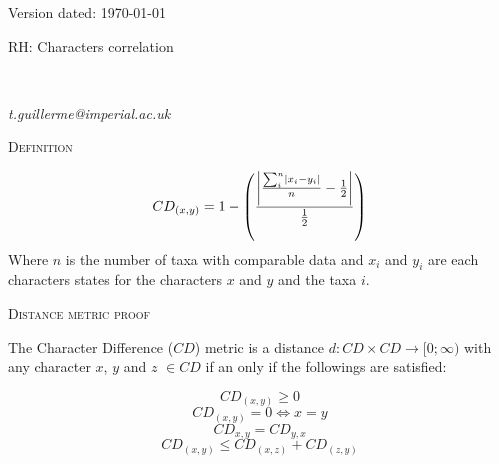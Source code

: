 \documentclass[12pt,letterpaper]{article}
\DeclarePairedDelimiter\abs{\lvert}{\rvert}%
\renewcommand{\section}[1]{%
\bigskip
\begin{center}
\begin{Large}
\normalfont\scshape #1
\medskip
\end{Large}
\end{center}}
\begin{document}
\begin{flushright}
Version dated: \today
\end{flushright}
\bigskip
\noindent RH: Characters correlation

\bigskip
\medskip
\begin{center}

\bigskip

\\
\end{center}
\medskip
{} \textit{t.guillerme@imperial.ac.uk}\\ 


\section{Definition}

\begin{equation}
    CD_{(x,y)} = 1 - \left(\frac{\abs*{\frac{\sum_{i}^{n}\abs{x_{i} - y_{i}}}{n}-\frac{1}{2}}}{\frac{1}{2}}\right)
\end{equation}
\noindent Where $n$ is the number of taxa with comparable data and $x_i$ and $y_i$ are each characters states for the characters $x$ and $y$ and the taxa $i$.

\newpage
\section{Distance metric proof}

The Character Difference ($CD$) metric is a distance $d: CD \times CD \rightarrow [0;\infty)$ with any character $x$, $y$ and $z$ $\in CD$ if an only if the followings are satisfied:

\begin{equation}
    \label{Positivity}
    CD_{(x,y)} \geq 0
\end{equation}
\begin{equation}
    \label{Identity}
    CD_{(x,y)} = 0 \Leftrightarrow x = y
\end{equation}
\begin{equation}
    \label{Equality}
    CD_{x,y} = CD_{y,x}
\end{equation}
\begin{equation}
    \label{Subadditivity}
    CD_{(x,y)} \leq CD_{(x,z)} + CD_{(z,y)}
\end{equation}
\end{document}
